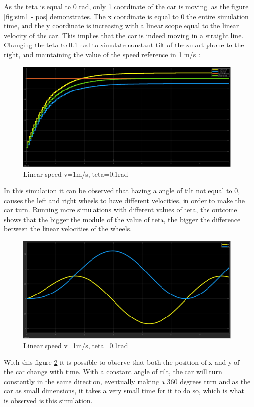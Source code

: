 As the teta is equal to 0 rad, only 1 coordinate of the car is moving, as the figure \ref{fig:sim1 - pos} demonstrates. The x coordinate is equal to 0 the entire simulation time, and the y coordinate is increasing with a linear scope equal to the linear velocity of the car. This implies that the car is indeed moving in a straight line.\\
\newpage
Changing the teta to 0.1 rad to simulate constant tilt of the smart phone to the right, and maintaining the value of the speed reference in 1 m/s :\
\begin{figure}[!h]
\centering
\includegraphics[width=1.0\textwidth]{./img/vel101.png}
\caption {\label{fig:sim2 - vel}Linear speed v=1m/s, teta=0.1rad}
\end{figure}
In this simulation it can be observed that having a angle of tilt not equal to 0, causes the left and right wheels to have different velocities, in order to make the car turn. Running more simulations with different values of teta, the outcome shows that the bigger the module of the value of teta, the bigger the difference between the linear velocities of the wheels.
\begin{figure}[!ht]
\centering
\includegraphics[width=1.0\textwidth]{./img/xy101.png}
\caption {\label{fig:sim2 - pos}Linear speed v=1m/s, teta=0.1rad}
\end{figure}
With this figure \ref{fig:sim2 - pos} it is possible to observe that both the position of x and y of the car change with time. With a constant angle of tilt, the car will turn constantly in the same direction, eventually making a 360 degrees turn and as the car as small dimensions, it takes a very small time for it to do so, which is what is observed is this simulation.